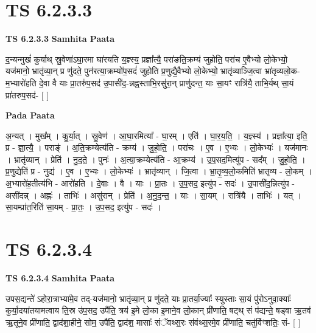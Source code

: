 \documentclass[17pt]{extarticle}
\begin{document}
\section{ TS 6.2.3.3 }

\textbf{TS 6.2.3.3 } \newline
\textbf{Samhita Paata} \newline

द॒न्यन्मुखं॑ कुर्याथ् स्रु॒वेणा॑ऽघा॒रमा घा॑रयति य॒ज्ञ्स्य॒ प्रज्ञा᳚त्यै॒ परा॑ङति॒क्रम्य॑ जुहोति॒ परा॑च ए॒वैभ्यो लो॒केभ्यो॒ यज॑मानो॒ भ्रातृ॑व्या॒न् प्र णु॑दते॒ पुन॑रत्या॒क्रम्यो॑प॒सदं॑ जुहोति प्र॒णुद्यै॒वैभ्यो लो॒केभ्यो॒ भ्रातृ॑व्याञ्जि॒त्वा भ्रा॑तृव्यलो॒क-म॒भ्यारो॑हति दे॒वा वै याः प्रा॒तरु॑प॒सद॑ उ॒पासी॑द॒-न्नह्न॒स्ताभि॒रसु॑रा॒न् प्राणु॑दन्त॒ याः सा॒यꣳ रात्रि॑यै॒ ताभि॒र्यथ् सा॒यं प्रा॑तरुप॒सद॑- [  ] \newline

\textbf{Pada Paata} \newline

अ॒न्यत् । मुख᳚म् । कु॒र्या॒त् । स्रु॒वेण॑ । आ॒घा॒रमित्या᳚ - घा॒रम् । एति॑ । घा॒र॒य॒ति॒ । य॒ज्ञ्स्य॑ । प्रज्ञा᳚त्या॒ इति॒ प्र - ज्ञा॒त्यै॒ । पराङ्॑ । अ॒ति॒क्रम्येत्य॑ति - क्रम्य॑ । जु॒हो॒ति॒ । परा॑चः । ए॒व । ए॒भ्यः । लो॒केभ्यः॑ । यज॑मानः । भ्रातृ॑व्यान् । प्रेति॑ । नु॒द॒ते॒ । पुनः॑ । अ॒त्या॒क्रम्येत्य॑ति - आ॒क्रम्य॑ । उ॒प॒सद॒मित्यु॑प - सद᳚म् । जु॒हो॒ति॒ । प्र॒णुद्येति॑ प्र - नुद्य॑ । ए॒व । ए॒भ्यः । लो॒केभ्यः॑ । भ्रातृ॑व्यान् । जि॒त्वा । भ्रा॒तृ॒व्य॒लो॒कमिति॑ भ्रातृव्य - लो॒कम् । अ॒भ्यारो॑ह॒तीत्य॑भि - आरो॑हति । दे॒वाः । वै । याः । प्रा॒तः । उ॒प॒सद॒ इत्यु॑प - सदः॑ । उ॒पासी॑द॒न्नित्यु॑प - असी॑दन्न् । अह्नः॑ । ताभिः॑ । असु॑रान् । प्रेति॑ । अ॒नु॒द॒न्त॒ । याः । सा॒यम् । रात्रि॑यै । ताभिः॑ । यत् । सा॒यम्प्रा॑त॒रिति॑ सा॒यम् - प्रा॒तः॒ । उ॒प॒सद॒ इत्यु॑प - सदः॑ ।  \newline





\section{ TS 6.2.3.4 }

\textbf{TS 6.2.3.4 } \newline
\textbf{Samhita Paata} \newline

उपस॒द्यन्ते॑ ऽहोरा॒त्राभ्या॑मे॒व तद्-यज॑मानो॒ भ्रातृ॑व्या॒न् प्र णु॑दते॒ याः प्रा॒तर्या॒ज्याः᳚ स्युस्ताः सा॒यं पु॑रोऽनुवा॒क्याः᳚ कुर्या॒दया॑तयामत्वाय ति॒स्र उ॑प॒सद॒ उपै॑ति॒ त्रय॑ इ॒मे लो॒का इ॒माने॒व लो॒कान् प्री॑णाति॒ षट्थ् सं प॑द्यन्ते॒ षड्वा ऋ॒तव॑ ऋ॒तूने॒व प्री॑णाति॒ द्वाद॑शा॒हीने॒ सोम॒ उपै॑ति॒ द्वाद॑श॒ मासाः᳚ संॅवथ्स॒रः स॑वंथ्स॒रमे॒व प्री॑णाति॒ चतु॑र्विꣳशतिः॒ सं- [  ] \newline
\end{document}
